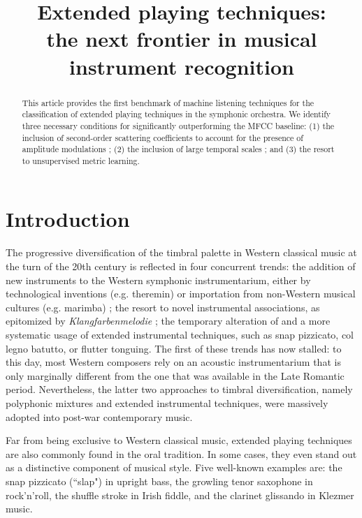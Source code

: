 \documentclass{article}
\title{Extended playing techniques: \\
the next frontier in musical instrument recognition}
\begin{document}
%
\maketitle
%
\begin{abstract}
This article provides the first benchmark of machine listening techniques for the classification of extended playing techniques in the symphonic orchestra.
We identify three necessary conditions for significantly outperforming the MFCC baseline:
(1) the inclusion of second-order scattering coefficients to account for the presence of amplitude modulations ;
(2) the inclusion of large temporal scales ; and
(3) the resort to unsupervised metric learning.
\end{abstract}
%
\section{Introduction}\label{sec:introduction}

The progressive diversification of the timbral palette in Western classical music at the turn of the 20th century is reflected in four concurrent trends:
the addition of new instruments to the Western symphonic instrumentarium, either by technological inventions (e.g. theremin) or importation from non-Western musical cultures (e.g. marimba) ; 
the resort to novel instrumental associations, as epitomized by \emph{Klangfarbenmelodie} ;
the temporary alteration of 
and a more systematic usage of extended instrumental techniques, such as snap pizzicato, col legno batutto, or flutter tonguing.
The first of these trends has now stalled: to this day, most Western composers rely on an acoustic instrumentarium that is only marginally different from the one that was available in the Late Romantic period.
Nevertheless, the latter two approaches to timbral diversification, namely polyphonic mixtures and extended instrumental techniques, were massively adopted into post-war contemporary music.



Far from being exclusive to Western classical music, extended playing techniques are also commonly found in the oral tradition.
In some cases, they even stand out as a distinctive component of musical style.
Five well-known examples are:
the snap pizzicato (``slap") in upright bass,
the growling tenor saxophone in rock'n'roll,
the shuffle stroke in Irish fiddle,
and the clarinet glissando in Klezmer music.
\end{document}
